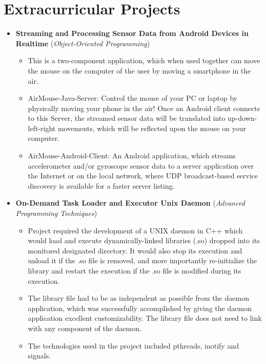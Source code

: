 \documentclass[11pt,a4paper,sans]{moderncv}
\begin{document}
\section{Extracurricular Projects}
	\begin{itemize}
	\item	\label{oop}  \textbf{Streaming and Processing Sensor Data from Android Devices in Realtime} (\textit{Object-Oriented Programming})
		{\small\begin{itemize}
		\item	This is a two-component application, which when used together can move the mouse on the computer of the user by moving a smartphone in the air.
		\item	AirMouse-Java-Server: Control the mouse of your PC or laptop by physically moving your phone in the air! Once an Android client connects to this Server, the streamed sensor data will be translated into up-down-left-right movements, which will be reflected upon the mouse on your computer.
		\item	AirMouse-Android-Client: An Android application, which streams accelerometer and/or gyroscope sensor data to a server application over the Internet or on the local network, where UDP broadcast-based service discovery is available for a faster server listing.
		\end{itemize}}
	\item	\label{apt}  \textbf{On-Demand Task Loader and Executor Unix Daemon} (\textit{Advanced Programming Techniques})
		{\small\begin{itemize}
		\item	Project required the development of a UNIX daemon in C++ which would load and execute dynamically-linked libraries (.so) dropped into its monitored designated directory. It would also stop its execution and unload it if the .so file is removed, and more importantly re-initialize the library and restart the execution if the .so file is modified during its execution.
		\item	The library file had to be as independent as possible from the daemon application, which was successfully accomplished by giving the daemon application excellent customizability. The library file does not need to link with any component of the daemon.
		\item	The technologies used in the project included pthreads, inotify and signals.

\end{itemize}}
\end{itemize}
\end{document}
